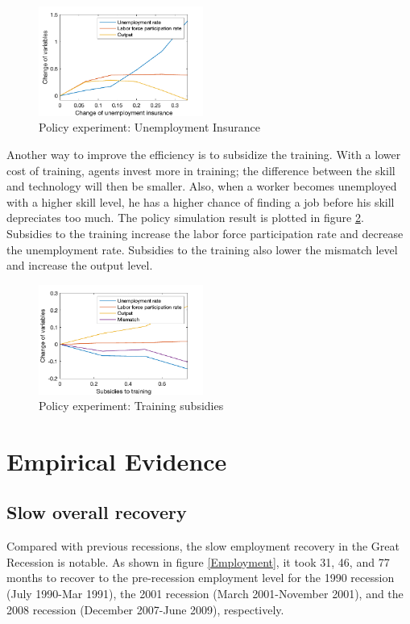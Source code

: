 \documentclass[12pt]{article}
\newcommand{\1}{\mathbb{1}}
\begin{document}
\begin{figure}[h!]
\centering
\includegraphics[width=0.48\textwidth]{Simulation1}
\caption{Policy experiment: Unemployment Insurance}
\label{Simulation1}
\end{figure}

Another way to improve the efficiency is to subsidize the training. With a lower cost of training, agents invest more in training; the difference between the skill and technology will then be smaller. Also, when a worker becomes unemployed with a higher skill level, he has a higher chance of finding a job before his skill depreciates too much. The policy simulation result is plotted in figure \ref{Simulation2}. Subsidies to the training increase the labor force participation rate and decrease the unemployment rate. Subsidies to the training also lower the mismatch level and increase the output level. 
\begin{figure}[h!]
\centering
\includegraphics[width=0.48\textwidth]{Simulation2}
\caption{Policy experiment: Training subsidies}
\label{Simulation2}
\end{figure}

\section{Empirical Evidence}
\subsection{Slow overall recovery}
Compared with previous recessions, the slow employment recovery in the Great Recession is notable. As shown in figure \ref{Employment}, it took 31, 46, and 77 months to recover to the pre-recession employment level for the 1990 recession (July 1990-Mar 1991), the 2001 recession (March 2001-November 2001), and the 2008 recession (December 2007-June 2009), respectively. \\
\end{document}
